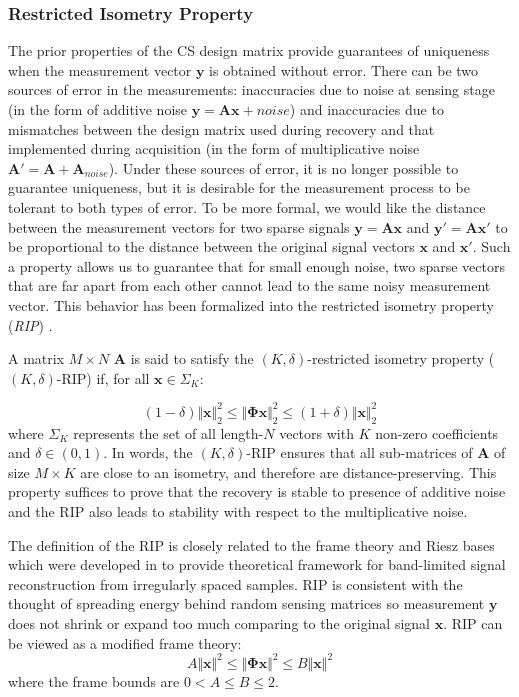 \documentclass[journal]{IEEEtran}
\begin{document}
\subsubsection{Restricted Isometry Property}
The prior properties of the CS design matrix provide guarantees of uniqueness when the measurement vector $\boldsymbol{y}$ is obtained without error. There can be two sources of error in the measurements: inaccuracies due to noise at sensing stage (in the form of additive noise $\boldsymbol{y}=\boldsymbol{A}\boldsymbol{x}+noise$) and inaccuracies due to mismatches between the design matrix used during recovery and that implemented during acquisition (in the form of multiplicative noise $\boldsymbol{A'}=\boldsymbol{A}+\boldsymbol{A}_{noise}$). Under these sources of error, it is no longer possible to guarantee uniqueness, but it is desirable for the measurement process to be tolerant to both types of error. To be more formal, we would like the distance between the measurement vectors for two sparse signals $\boldsymbol{y}=\boldsymbol{A}\boldsymbol{x}$ and $\boldsymbol{y'}=\boldsymbol{A}\boldsymbol{x'}$ to be proportional to the distance between the original signal vectors $\boldsymbol{x}$ and $\boldsymbol{x'}$. Such a property allows us to guarantee that for small enough noise, two sparse vectors that are far apart from each other cannot lead to the same noisy measurement vector. This behavior has been formalized into the restricted isometry property (\textit{RIP}) \cite{Moreira2014, Romberg2013, CANDES2008589, Blanchard2011}. 

A matrix $M\times N$ $\boldsymbol{A}$ is said to satisfy the $(K,\delta)$-restricted isometry property ($(K,\delta)$-RIP) if, for all $\boldsymbol{x}\in\Sigma_K$:

\begin{equation} \label{eq:rip}
	(1-\delta)\Vert \boldsymbol{x}\Vert^2_2\leq\Vert\boldsymbol{\Phi }\boldsymbol{x}\Vert_2^2\leq(1+\delta)\Vert\boldsymbol{x}\Vert_2^2
\end{equation}
%
where $\Sigma_K$ represents the set of all length-$N$ vectors with $K$ non-zero coefficients and $\delta \in (0,1)$. In words, the $(K,\delta)$-RIP ensures that all sub-matrices of $\boldsymbol{A}$ of size $M\times K$ are close to an isometry, and therefore are distance-preserving. This property suffices to prove that the recovery is stable to presence of additive noise and the RIP also leads to stability with respect to the multiplicative noise.

The definition of the RIP is closely related to the frame theory and Riesz bases which were developed in \cite{duffin1952class} to provide theoretical framework for band-limited signal reconstruction from irregularly spaced samples. RIP is consistent with the thought of spreading energy behind random sensing matrices so measurement $\boldsymbol{y}$ does not shrink or expand too much comparing to the original signal $\boldsymbol{x}$. RIP can be viewed as a modified frame theory:
%
\begin{equation} \label{eq:frame}
	A\Vert \boldsymbol{x}\Vert^2\leq\Vert\boldsymbol{\Phi }\boldsymbol{x}\Vert^2\leq B\Vert\boldsymbol{x}\Vert^2
\end{equation}
%
where the frame bounds are $0<A\leq B \leq 2$.
\end{document}
